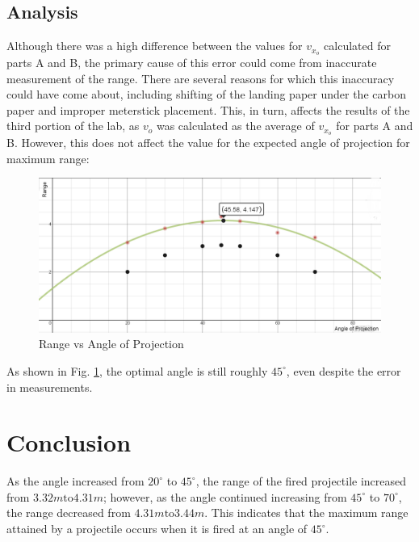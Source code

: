 \documentclass[11pt, titlepage]{article}
\begin{document}
\subsection*{Analysis}
Although there was a high difference between the values for $v_{x_o}$ calculated for parts A and B, the primary cause of this error could come from inaccurate measurement of the range. There are several reasons for which this inaccuracy could have come about, including shifting of the landing paper under the carbon paper and improper meterstick placement. This, in turn, affects the results of the third portion of the lab, as $v_o$ was calculated as the average of $v_{x_o}$ for parts A and B. However, this does not affect the value for the expected angle of projection for maximum range:
\begin{figure}[!ht]
\centering
\includegraphics[scale=.4, angle=0]{lab02_graph.png}
\caption{Range vs Angle of Projection \label{fig:graph}}
\end{figure}

\noindent As shown in Fig. \ref{fig:graph}, the optimal angle is still roughly $45^\circ$, even despite the error in measurements.

\section*{Conclusion}
As the angle increased from $20^\circ$ to $45^\circ$, the range of the fired projectile increased from $3.32 m \text{to} 4.31 m$; however, as the angle continued increasing from $45^\circ$ to $70^\circ$, the range decreased from $4.31 m \text{to} 3.44 m$. This indicates that the maximum range attained by a projectile occurs when it is fired at an angle of $45^\circ$.
\end{document}
